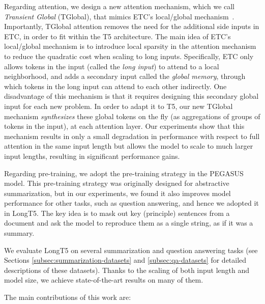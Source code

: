 Regarding attention, we design a new attention mechanism, which we call {\em Transient Global} (TGlobal), that mimics ETC's local/global mechanism~\cite{etc}. Importantly, TGlobal attention removes the need for the additional side inputs in ETC, in order to fit within the T5 architecture. The main idea of ETC's local/global mechanism is to introduce local sparsity in the attention mechanism to reduce the quadratic cost when scaling to long inputs. Specifically, ETC only allows tokens in the input (called the {\em long input}) to attend to a local neighborhood, and adds a secondary input called the {\em global memory}, through which tokens in the long input can attend to each other indirectly. One disadvantage of this mechanism is that it requires designing this secondary global input for each new problem. In order to adapt it to T5, our new TGlobal mechanism {\em synthesizes} these global tokens on the fly (as aggregations of groups of tokens in the input), at each attention layer. Our experiments show that this mechanism results in only a small degradation in performance with respect to full attention in the same input length but allows the model to scale to much larger input lengths, resulting in significant performance gains.

Regarding pre-training, we adopt the pre-training strategy in the PEGASUS~\cite{pegasus} model. This pre-training strategy was originally designed for abstractive summarization, but in our experiments, we found it also improves model performance for other tasks, such as question answering, and hence we adopted it in LongT5. The key idea is to mask out key (principle) sentences from a document and ask the model to reproduce them as a single string, as if it was a summary.

We evaluate LongT5 on several summarization and question answering tasks (see Sections \ref{subsec:summarization-datasets} and \ref{subsec:qa-datasets} for detailed descriptions of these datasets). Thanks to the scaling of both input length and model size, we achieve state-of-the-art results on many of them.

The main contributions of this work are:

